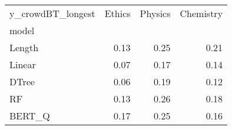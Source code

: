 \begin{tabular}{lrrr}
\toprule
y\_crowdBT\_longest &  Ethics &  Physics &  Chemistry \\
model  &         &          &            \\
\midrule
Length &    0.13 &     0.25 &       0.21 \\
Linear &    0.07 &     0.17 &       0.14 \\
DTree  &    0.06 &     0.19 &       0.12 \\
RF     &    0.13 &     0.26 &       0.18 \\
BERT\_Q &    0.17 &     0.25 &       0.16 \\
\bottomrule
\end{tabular}

